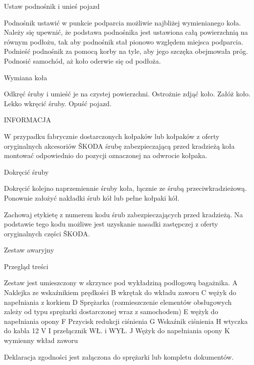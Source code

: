 Ustaw podnośnik i unieś pojazd
\begin{itemizeArrow}
	\itemArrow Podnośnik ustawić w punkcie podparcia możliwie najbliżej wymienianego koła.
	\itemArrow Należy się upewnić, że podstawa podnośnika jest ustawiona całą powierzchnią na równym podłożu, tak aby podnośnik stał pionowo względem miejsca podparcia.
	\itemArrow Podnieść podnośnik za pomocą korby na tyle, aby jego szczęka obejmowała próg.
	\itemArrow Podnosić samochód, aż koło oderwie się od podłoża.
\end{itemizeArrow}

Wymiana koła
\begin{itemizeArrow}
	\itemArrow Odkręć śruby i umieść je na czystej powierzchni.
	\itemArrow Ostrożnie zdjąć koło.
	\itemArrow Załóż koło.
	\itemArrow Lekko wkręcić śruby.
	\itemArrow Opuść pojazd.
\end{itemizeArrow}

INFORMACJA
\begin{itemizeTriangle}
	\itemTriangle W przypadku fabrycznie dostarczonych kołpaków lub kołpaków z oferty oryginalnych akcesoriów ŠKODA śrubę zabezpieczającą przed kradzieżą koła montować odpowiednio do pozycji oznaczonej na odwrocie kołpaka.
\end{itemizeTriangle}

Dokręcić śruby
\begin{itemizeArrow}
	\itemArrow Dokręcić kolejno naprzemiennie śruby koła, łącznie ze śrubą przeciwkradzieżową.
	\itemArrow Ponownie założyć nakładki śrub kół lub pełne kołpaki kół.
\end{itemizeArrow}

Zachowaj etykietę z numerem kodu śrub zabezpieczających przed kradzieżą. Na podstawie tego kodu możliwe jest uzyskanie nasadki zastępczej z oferty oryginalnych części ŠKODA.

Zestaw awaryjny

Przegląd treści

Zestaw jest umieszczony w skrzynce pod wykładziną podłogową bagażnika.
A Naklejka ze wskaźnikiem prędkości
B wkrętak do wkładu zaworu
C wężyk do napełniania z korkiem
D Sprężarka (rozmieszczenie elementów obsługowych zależy od typu sprężarki dostarczonej wraz
z samochodem)
E wężyk do napełniania opony
F Przycisk redukcji ciśnienia
G Wskaźnik ciśnienia
H wtyczka do kabla 12 V
I przełącznik WŁ. i WYŁ.
J Wężyk do napełniania opony
K wymienny wkład zaworu

Deklaracja zgodności jest załączona do sprężarki lub kompletu dokumentów.

